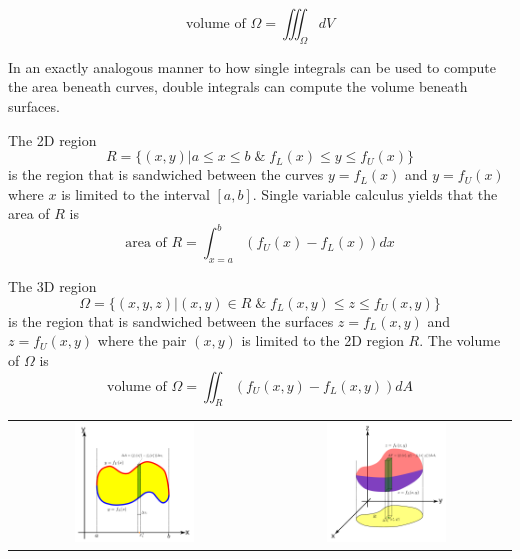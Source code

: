 \documentclass{article}
\begin{document}
\[\text{volume of \(\Omega\)} = \iiint_{\Omega} dV\]

In an exactly analogous manner to how single integrals can be used to compute the area beneath curves, double integrals can compute the volume beneath surfaces. 

The 2D region 
\[R = \{(x,y) | a \leq x \leq b \;\&\; f_L(x) \leq y \leq f_U(x)\}\] 
is the region that is sandwiched between the curves \(y = f_L(x)\) and \(y = f_U(x)\) where \(x\) is limited to the interval \([a,b]\). Single variable calculus yields that the area of \(R\) is 
\[\text{area of \(R\)} = \int_{x = a}^b (f_U(x) - f_L(x))dx\] 

The 3D region 
\[\Omega = \{(x,y,z) | (x,y) \in R \;\&\; f_L(x,y) \leq z \leq f_U(x,y)\}\] 
is the region that is sandwiched between the surfaces \(z = f_L(x,y)\) and \(z = f_U(x,y)\) where the pair \((x, y)\) is limited to the 2D region \(R\). The volume of \(\Omega\) is 
\[\text{volume of \(\Omega\)} = \iint_{R} (f_U(x,y) - f_L(x,y))dA\] 

\begin{tabular}{cc}
\parbox{0.5\textwidth}{
\includegraphics[width = 0.5\textwidth]{area_by_single_integral}
} & \parbox{0.5\textwidth}{
\includegraphics[width = 0.5\textwidth]{volume_by_double_integral}
}
\end{tabular}
\end{document}
